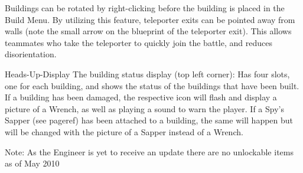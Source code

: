 Buildings can be rotated by right-clicking before the building is placed in the Build Menu. By utilizing this feature,  teleporter exits can be pointed away from walls (note the small arrow on the blueprint of the teleporter exit). This allows teammates who take the teleporter to quickly join the battle, and reduces disorientation.

Heads-Up-Display
The building status display (top left corner): Has four slots, one for each building, and shows the status of the buildings that have been built. If a building has been damaged, the respective icon will  flash and display a picture of a Wrench, as well as playing a sound to warn the player. If a Spy's Sapper (see {{pageref}}) has been attached to a building, the same will happen but will be changed with the picture of a Sapper instead of a Wrench.
 
Note: As the Engineer is yet to receive an update there are no unlockable items as of May 2010 
 